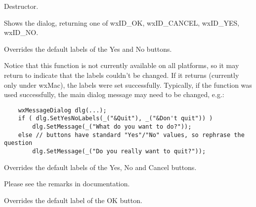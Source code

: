 

\label{wxmessagedialogdtor}


Destructor.


\label{wxmessagedialogshowmodal}


Shows the dialog, returning one of wxID\_OK, wxID\_CANCEL, wxID\_YES, wxID\_NO.


\label{wxmessagedialogsetyesnolabels}


Overrides the default labels of the Yes and No buttons.

Notice that this function is not currently available on all platforms, so it
may return \false to indicate that the labels couldn't be changed. If it
returns \true (currently only under wxMac), the labels were set successfully.
Typically, if the function was used successfully, the main dialog message may
need to be changed, e.g.:
\begin{verbatim}
    wxMessageDialog dlg(...);
    if ( dlg.SetYesNoLabels(_("&Quit"), _("&Don't quit")) )
        dlg.SetMessage(_("What do you want to do?"));
    else // buttons have standard "Yes"/"No" values, so rephrase the question
        dlg.SetMessage(_("Do you really want to quit?"));
\end{verbatim}


\label{wxmessagedialogsetyesnocancellabels}


Overrides the default labels of the Yes, No and Cancel buttons.

Please see the remarks in 
 documentation.


\label{wxmessagedialogsetyesoklabel}


Overrides the default label of the OK button.


